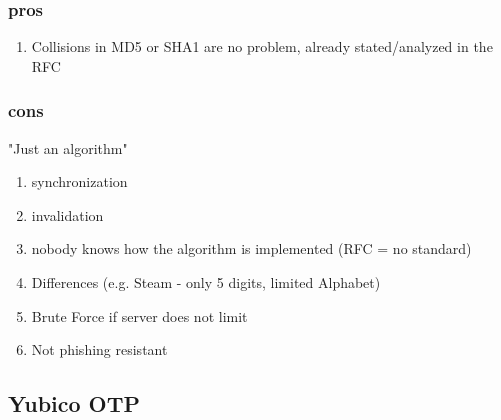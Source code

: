 \subsubsection{pros}

\begin{enumerate}
	\item Collisions in MD5 or SHA1 are no problem, already stated/analyzed in the RFC
\end{enumerate}

\subsubsection{cons}

"Just an algorithm"

\begin{enumerate}
	\item synchronization
	\item invalidation
	\item nobody knows how the algorithm is implemented (RFC = no standard)
	\item Differences (e.g. Steam - only 5 digits, limited Alphabet)
	\item Brute Force if server does not limit
	\item Not phishing resistant
\end{enumerate}

\subsection{Yubico OTP}